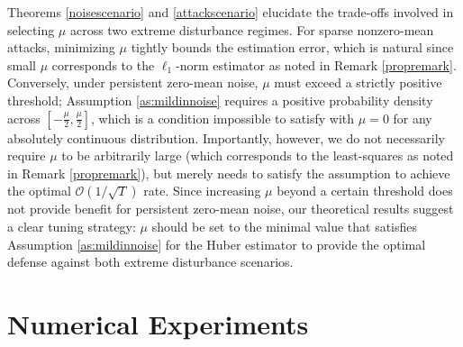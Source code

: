 \documentclass[letterpaper,10pt,conference]{ieeeconf}
\theoremstyle{plain} %
\theoremstyle{plain} %
\theoremstyle{plain} %
\theoremstyle{plain}
\begin{document}
Theorems \ref{noisescenario} and \ref{attackscenario} elucidate the trade-offs involved in selecting $\mu$ across two extreme disturbance regimes. For sparse nonzero-mean attacks, minimizing $\mu$ tightly bounds the estimation error, which is natural since small $\mu$ corresponds to the $\ell_1$-norm estimator as noted in Remark \ref{propremark}. 
Conversely, under persistent zero-mean noise, $\mu$ must exceed a strictly positive threshold; Assumption \ref{as:mildinnoise} requires a positive probability density across $[-\frac{\mu}{2}, \frac{\mu}{2}]$, which is a condition impossible to satisfy with $\mu=0$ for any absolutely continuous distribution. 
Importantly, however, we do not necessarily require $\mu$ to be arbitrarily large (which corresponds to the least-squares as noted in Remark \ref{propremark}), but merely needs to satisfy the assumption to achieve the optimal $\mathcal{O}(1/\sqrt{T})$ rate. Since increasing $\mu$ beyond a certain threshold does not provide benefit for persistent zero-mean noise,  our theoretical results suggest a clear tuning strategy: $\mu$ should be set to the minimal value that satisfies Assumption \ref{as:mildinnoise} for the Huber estimator to provide the optimal defense against both extreme disturbance scenarios. 



\section{Numerical Experiments}\label{sec:numerical}
\end{document}
